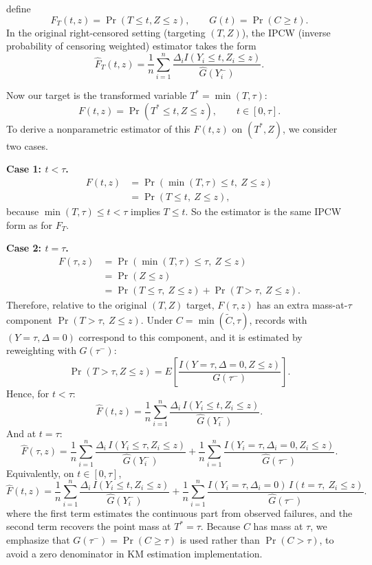 \documentclass[11pt]{article}
\begin{document}
\citet{qin_conformal_2025} define
\[
F_T(t,z)=\Pr(T\le t, Z\le z), \qquad G(t)=\Pr(C\ge t).
\]
In the original right-censored setting (targeting $(T,Z)$), the IPCW (inverse probability of censoring weighted) estimator
 takes the form
\[
\widehat F_T(t,z)=\frac{1}{n}\sum_{i=1}^n
\frac{\Delta_i I(Y_i\le t, Z_i\le z)}{\widehat G(Y_i^-)}.
\]

Now our target is the transformed variable $T^*=\min(T,\tau)$:
\[
F(t,z)=\Pr(T^*\le t, Z\le z), \qquad t\in[0,\tau].
\]
To derive a nonparametric estimator of this $F(t,z)$ on $(T^*,Z)$, we consider two cases.

\textbf{Case 1: $t<\tau$.}
\[
\begin{aligned}
F(t,z)
&=\Pr(\min(T,\tau)\le t,\ Z\le z) \\
&=\Pr(T\le t,\ Z\le z),
\end{aligned}
\]
because $\min(T,\tau)\le t<\tau$ implies $T\le t$.
So the estimator is the same IPCW form as for $F_T$.

\textbf{Case 2: $t=\tau$.}
\[
\begin{aligned}
F(\tau,z)
&=\Pr(\min(T,\tau)\le \tau,\ Z\le z) \\
&=\Pr(Z\le z) \\
&=\Pr(T\le \tau,\ Z\le z)+\Pr(T>\tau,\ Z\le z).
\end{aligned}
\]
Therefore, relative to the original $(T,Z)$ target, $F(\tau,z)$ has an extra
mass-at-$\tau$ component $\Pr(T>\tau,\ Z\le z)$.
Under $C=\min(\widetilde C,\tau)$, records with $(Y=\tau,\Delta=0)$ correspond to
this component, and it is estimated by reweighting with $G(\tau^-)$:
\[
\Pr(T>\tau,Z\le z)
=E\!\left[\frac{I(Y=\tau,\Delta=0,Z\le z)}{G(\tau^-)}\right].
\]
Hence, for $t<\tau$:
\[
\widehat F(t,z)
= \frac{1}{n} \sum_{i=1}^n
\frac{\Delta_i\, I(Y_i \le t, Z_i \le z)}{\widehat G(Y_i^-)}.
\]
And at $t=\tau$:
\[
\widehat F(\tau,z)
= \frac{1}{n} \sum_{i=1}^n
\frac{\Delta_i\, I(Y_i \le \tau, Z_i \le z)}{\widehat G(Y_i^-)}
+ \frac{1}{n} \sum_{i=1}^n
\frac{I(Y_i=\tau,\Delta_i=0,Z_i\le z)}{\widehat G(\tau^-)}.
\]
Equivalently, on $t\in[0,\tau]$,
\[
\widehat F(t,z)
= \frac{1}{n} \sum_{i=1}^n
\frac{\Delta_i\, I(Y_i \le t, Z_i \le z)}{\widehat G(Y_i^-)}
+ \frac{1}{n} \sum_{i=1}^n
\frac{I(Y_i=\tau,\Delta_i=0)\,I(t=\tau,\ Z_i\le z)}{\widehat G(\tau^-)}.
\]
where the first term estimates the continuous part from observed failures, and the
second term recovers the point mass at $T^*=\tau$. Because $C$ has mass at $\tau$,
we emphasize that $G(\tau^-)=\Pr(C\ge\tau)$ is used rather than $\Pr(C>\tau)$, to avoid a zero denominator in KM estimation implementation.
\end{document}
